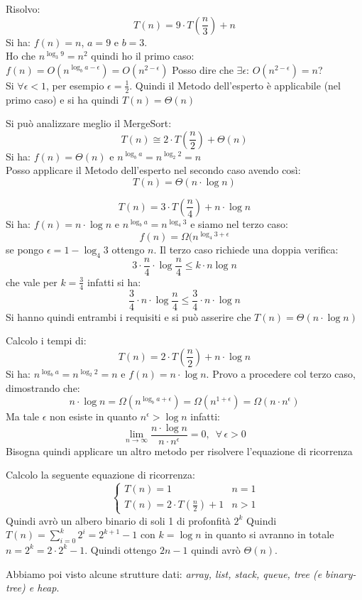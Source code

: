 \documentclass[a4paper,12pt, oneside]{book}
\begin{document}
\begin{shaded}
  \begin{esempio}
    Risolvo:
    $$T(n)=9\cdot T\left(\frac{n}{3}\right)+n$$
    Si ha: $f(n)=n$, $a=9$ e $b=3$.\\
    Ho che $n^{\log_3 9}=n^2$ quindi ho il primo caso:\\
    $f(n)=O(n^{\log_b a -\epsilon})=O(n^{2-\epsilon})$
    Posso dire che $\exists \epsilon:\, O(n^{2-\epsilon})=n$?\\
    Si $\forall \epsilon<1$, per esempio $\epsilon=\frac{1}{2}$. Quindi il Metodo dell'esperto è applicabile (nel primo caso) e si ha quindi $T(n)=\Theta(n)$
  \end{esempio}
  \newpage
  \begin{esempio}
    Si può analizzare meglio il MergeSort:
    $$T(n)\cong 2\cdot T\left(\frac{n}{2}\right)+\Theta(n)$$
    Si ha: $f(n)=\Theta(n)$ e $n^{\log_b a}=n^{\log_2 2 }=n$\\
    Posso applicare il Metodo dell'esperto nel secondo caso avendo così: $$T(n)=\Theta(n\cdot \log n)$$
  \end{esempio}
  \begin{esempio}
    $$T(n)=3\cdot T\left(\frac{n}{4}\right)+n\cdot \log n$$
    Si ha: $f(n)=n\cdot \log n$ e $n^{\log_b a}=n^{\log_4 3}$ e siamo nel terzo caso:
    $$f(n)=\Omega(n^{\log_4 3+\epsilon}$$
    se pongo $\epsilon=1-\log_4 3$ ottengo $n$.
    Il terzo caso richiede una doppia verifica:
    $$3\cdot \frac{n}{4}\cdot\log \frac{n}{4}\leq k\cdot n\log n$$
    che vale per $k=\frac{3}{4}$ infatti si ha:
    $$\frac{3}{4}\cdot n\cdot\log \frac{n}{4}\leq \frac{3}{4} \cdot n\cdot \log n$$
    Si hanno quindi entrambi i requisiti e si può asserire che $T(n)=\Theta(n\cdot\log n)$
  \end{esempio}
  \begin{esempio}
    Calcolo i tempi di:
    $$T(n)=2\cdot T\left(\frac{n}{2}\right)+n\cdot\log n$$
    Si ha: $n^{\log_b a }=n^{\log_2 2 }=n$ e $f(n)=n\cdot\log n$.
    Provo a procedere col terzo caso, dimostrando che: $$n\cdot\log n=\Omega(n^{\log_b a +\epsilon})=\Omega(n^{1+\epsilon})=\Omega(n\cdot n^\epsilon)$$
    Ma tale $\epsilon$ non esiste in quanto $n^\epsilon>\log n$ infatti:
    $$\lim_{n\rightarrow \infty}\frac{n\cdot\log n}{n\cdot n^\epsilon}=0,\,\,\, \forall\, \epsilon>0$$
    Bisogna quindi applicare un altro metodo per risolvere l'equazione di ricorrenza
  \end{esempio}
  \begin{esempio}
    Calcolo la seguente equazione di ricorrenza:
    \[\
      \begin{cases}
        T(n)=1 & n=1\\
        T(n)= 2\cdot T(\frac{n}{2})+1 & n>1
      \end{cases}
    \]
    Quindi avrò un albero binario di soli 1 di profonfità $2^k$
    Quindi $T(n)=\sum_{i=0}^k2^i=2^{k+1}-1$ con $k=\log n$ in quanto si avranno
    in totale $n=2^k=2\cdot2^k-1$. Quindi ottengo $2n-1$ quindi
    avrò $\Theta(n)$.
  \end{esempio}
\end{shaded}
Abbiamo poi visto alcune strutture dati: \textit{array, list, stack, queue,
  tree (e binary-tree) e heap}. 
\end{document}
